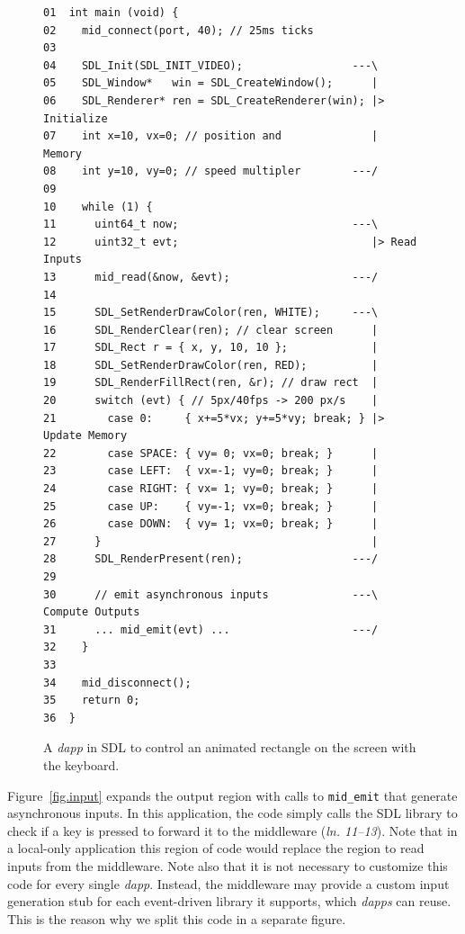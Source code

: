 \documentclass[sigplan,screen]{acmart}
\newcommand{\lin}[1]{(\emph{ln. #1}\xspace)}
\newcommand{\dapp}{\emph{dapp}\xspace}
\newcommand{\dapps}{\emph{dapps}\xspace}
\begin{document}
\begin{figure}[t]
{\scriptsize
\begin{verbatim}
01  int main (void) {
02    mid_connect(port, 40); // 25ms ticks
03
04    SDL_Init(SDL_INIT_VIDEO);                 ---\
05    SDL_Window*   win = SDL_CreateWindow();      |
06    SDL_Renderer* ren = SDL_CreateRenderer(win); |> Initialize
07    int x=10, vx=0; // position and              |    Memory
08    int y=10, vy=0; // speed multipler        ---/
09
10    while (1) {
11      uint64_t now;                           ---\
12      uint32_t evt;                              |> Read Inputs
13      mid_read(&now, &evt);                   ---/
14
15      SDL_SetRenderDrawColor(ren, WHITE);     ---\
16      SDL_RenderClear(ren); // clear screen      |
17      SDL_Rect r = { x, y, 10, 10 };             |
18      SDL_SetRenderDrawColor(ren, RED);          |
19      SDL_RenderFillRect(ren, &r); // draw rect  |
20      switch (evt) { // 5px/40fps -> 200 px/s    |
21        case 0:     { x+=5*vx; y+=5*vy; break; } |> Update Memory
22        case SPACE: { vy= 0; vx=0; break; }      |
23        case LEFT:  { vx=-1; vy=0; break; }      |
24        case RIGHT: { vx= 1; vy=0; break; }      |
25        case UP:    { vy=-1; vx=0; break; }      |
26        case DOWN:  { vy= 1; vx=0; break; }      |
27      }                                          |
28      SDL_RenderPresent(ren);                 ---/
29
30      // emit asynchronous inputs             ---\  Compute Outputs
31      ... mid_emit(evt) ...                   ---/
32    }
33
34    mid_disconnect();
35    return 0;
36  }
\end{verbatim}
}
  \caption{
    \label{fig.sdl}
    A \dapp in SDL to control an animated rectangle on the screen with the keyboard.
  }
\end{figure}

Figure~\ref{fig.input} expands the output region with calls to
\texttt{mid\_emit} that generate asynchronous inputs.
In this application, the code simply calls the SDL library to check if a key is
pressed to forward it to the middleware \lin{11--13}.
Note that in a local-only application this region of code would replace the
region to read inputs from the middleware.
Note also that it is not necessary to customize this code for every single
\dapp.
Instead, the middleware may provide a custom input generation stub for each
event-driven library it supports, which \dapps can reuse.
This is the reason why we split this code in a separate figure.
\end{document}
